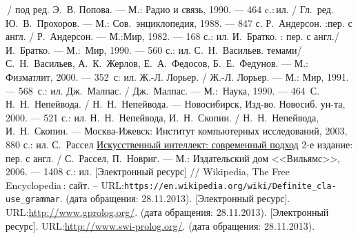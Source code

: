 \documentclass[12pt, openany, twoside]{book} %
\begin{document}
\begin{thebibliography}{99}
 \,{}/ под ред. Э.~В. Попова. --- М.: Радио и связь, 1990. --- 464 c.:\,{}ил.
  / Гл.~ред. Ю.~В.~Прохоров. --- М.: Сов.~энциклопедия, 1988. --- 847 с.
 Р.~Андерсон. :пер. с англ. / Р.~Андерсон. --- М.:Мир, 1982. --- 168 с.: ил.
 И.~Братко. : пер. с англ./ И.~Братко. --- М.:~Мир, 1990. --- 560 с.: ил.
 С.~Н.~Васильев.  темами/ С.~Н.~Васильев, А.~К.~Жерлов, Е.~А.~Федосов, Б.~Е.~Федунов. --- М.: Физматлит, 2000. --- 352~с: ил.
 Ж.-Л. Лорьер.  / Ж.-Л. Лорьер. --- М.: Мир, 1991. --- 568~с.: ил.
 Дж.~Малпас.  / Дж.~Малпас. --- М.:~Наука, 1990. --- 464~С.
 Н.~Н.~Непейвода.  / Н.~Н.~Непейвода. --- Новосибирск, Изд-во. Новосиб. ун-та, 2000. --- 521 с.: ил.
 Н.~Н.~Непейвода, И.~Н.~Скопин.  / Н.~Н.~Непейвода, И.~Н.~Скопин. — Москва-Ижевск: Институт компьютерных исследований, 2003, 880 с.: ил.
 С.~Рассел \href{http://www.aiportal.ru/downloads/books/ai-modern-approach-2-edition-by-rassel-norvig.html}{Искусственный интеллект: современный подход} 2-е издание: пер. с англ. / С.~Рассел, П.~Новриг. --- М.: Издательский дом <<Вильямс>>, 2006. --- 1408 с.: ил.
  [Электронный ресурс] // Wikipedia, The Free Encyclopedia\,{}: сайт. -- URL:\texttt{https://en.wikipedia.org/wiki/Definite\_cla-} \texttt{use\_grammar}. (дата обращения: 28.11.2013).
   [Электронный ресурс]. URL:\url{http://www.gprolog.org/}. (дата обращения: 28.11.2013).
  [Электронный ресурс]. URL:\url{http://www.swi-prolog.org/}. (дата обращения: 28.11.2013).
\end{thebibliography}
\label{pg:lastpage}
\end{document}
